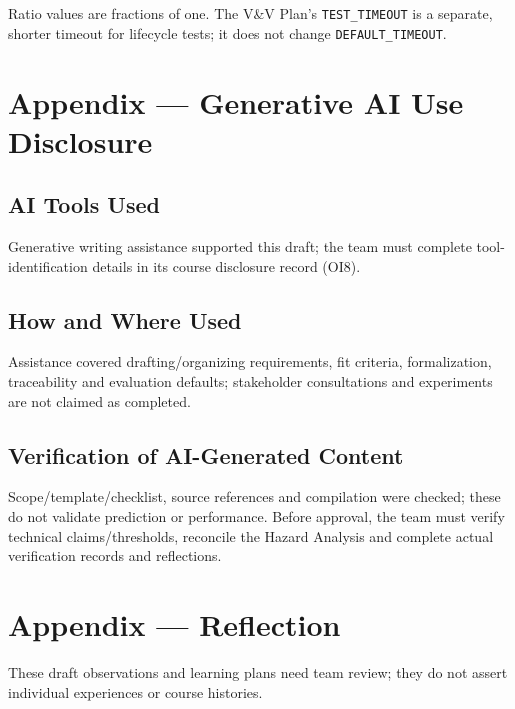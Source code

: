\documentclass[12pt]{article}
\begin{document}
Ratio values are fractions of one. The V\&V Plan's \texttt{TEST\_TIMEOUT}
is a separate, shorter timeout for lifecycle tests; it does not change
\texttt{DEFAULT\_TIMEOUT}.

\section{Appendix --- Generative AI Use Disclosure}


\subsection{AI Tools Used}
Generative writing assistance supported this draft; the team must complete
tool-identification details in its course disclosure record (OI8).

\subsection{How and Where Used}
Assistance covered drafting/organizing requirements, fit criteria,
formalization, traceability and evaluation defaults; stakeholder consultations
and experiments are not claimed as completed.

\subsection{Verification of AI-Generated Content}
Scope/template/checklist, source references and compilation were checked;
these do not validate prediction or performance. Before approval, the team
must verify technical claims/thresholds, reconcile the Hazard Analysis and
complete actual verification records and reflections.

\newpage{}

\section{Appendix --- Reflection}


These draft observations and learning plans need team review; they do not
assert individual experiences or course histories.
\end{document}
